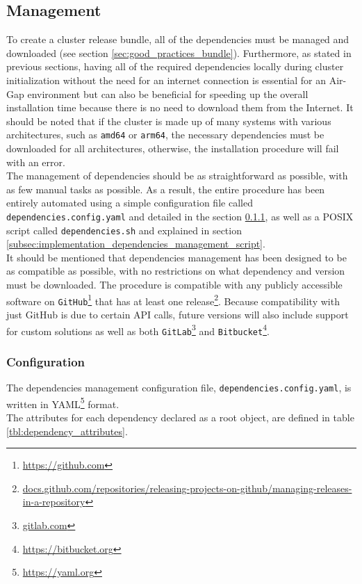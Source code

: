 \subsection{Management}
\label{subsec:implementation_dependencies_management}

To create a cluster release bundle, all of the dependencies must be managed and downloaded
(see section \ref{sec:good_practices_bundle}). Furthermore, as stated in previous
sections, having all of the required dependencies locally during cluster
initialization without the need for an internet connection is essential for an
Air-Gap environment but can also be beneficial for speeding up the overall
installation time because there is no need to download them from the Internet. It
should be noted that if the cluster is made up of many systems with various architectures,
such as \texttt{amd64} or \texttt{arm64}, the necessary dependencies must be downloaded
for all architectures, otherwise, the installation procedure will fail with an error.
\\ %
The management of dependencies should be as straightforward as possible, with as
few manual tasks as possible. As a result, the entire procedure has been
entirely automated using a simple configuration file called \texttt{dependencies.config.yaml}
and detailed in the section \ref{subsec:implementation_dependencies_management_configuration},
as well as a POSIX script called \texttt{dependencies.sh} and explained in section
\ref{subsec:implementation_dependencies_management_script}. \\ %
It should be mentioned that dependencies management has been designed to be as compatible
as possible, with no restrictions on what dependency and version must be
downloaded. The procedure is compatible with any publicly accessible software on
\texttt{GitHub}\footnote{\url{https://github.com}} that has at least one release\footnote{\url{docs.github.com/repositories/releasing-projects-on-github/managing-releases-in-a-repository}}.
Because compatibility with just GitHub is due to certain API calls, future
versions will also include support for custom solutions as well as both \texttt{GitLab}\footnote{\url{gitlab.com}}
and \texttt{Bitbucket}\footnote{\url{https://bitbucket.org}}.
\subsubsection{Configuration}
\label{subsec:implementation_dependencies_management_configuration}

The dependencies management configuration file, \texttt{dependencies.config.yaml},
is written in YAML\footnote{\url{https://yaml.org}} format. \\ %
The attributes for each dependency declared as a root object, are defined in
table \ref{tbl:dependency_attributes}.

